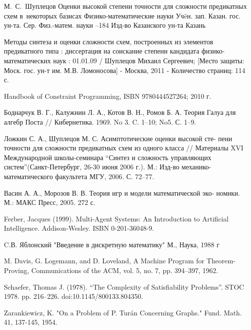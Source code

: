 \documentclass[12pt]{article}
\begin{document}
\clearpage
{}
    \by М.~С.~Шуплецов
    \paper Оценки высокой степени точности для сложности предикатных схем в~некоторых базисах
    \inbook Физико-математические науки
    \serial Уч\"eн. зап. Казан. гос. ун-та. Сер. Физ.-матем. науки
    --184
    \publ Изд-во Казанского ун-та
    \publaddr Казань

Методы синтеза и оценки сложности схем, построенных из элементов предикатного типа : 
диссертация на соискание степени кандидата физико-математических наук : 01.01.09 / Шуплецов Михаил Сергеевич; 
[Место защиты: Моск. гос. ун-т им. М.В. Ломоносова] - Москва, 2011 - Количество страниц: 114 с.

 Handbook of Constraint Programming, ISBN 9780444527264; 2010 г.

Боднарчук В. Г., Калужнин Л. А., Котов В. Н., Ромов Б. А. Теория
Галуа для алгебр Поста // Кибернетика. 1969. No 3. C. 1–10; No5. С. 1–9.

Ложкин С. А., Шуплецов М. С. Асимптотические оценки высокой сте-
пени точности для сложности предикатных схем из одного класса //
Материалы XVI Международной школы-семинара 
``Синтез и сложность управляющих систем''(Санкт-Петербург, 26-30 июня 2006 г.). М.:
Изд-во механико-математического факультета МГУ, 2006. С. 72–77.


Васин А. А., Морозов В. В. Теория игр и модели математической эко-
номики. М.: МАКС Пресс, 2005. 272 с.

Ferber, Jacques (1999). Multi-Agent Systems: An Introduction to Artificial Intelligence. Addison-Wesley.
ISBN 0-201-36048-9.

C.В. Яблонский "Введение в дискретную математику" М., Наука, 1988 г

M. Davis, G. Logemann, and D. Loveland, A Machine Program for Theorem-Proving,
Communications of the ACM, vol. 5, no. 7, pp. 394–397, 1962.

 Schaefer, Thomas J. (1978). 
``The Complexity of Satisfiability Problems''. STOC 1978. pp. 216–226. doi:10.1145/800133.804350.

 Zarankiewicz, K. "On a Problem of P. Turán Concerning Graphs." Fund. Math. 41, 137-145, 1954. 
\end{document}
